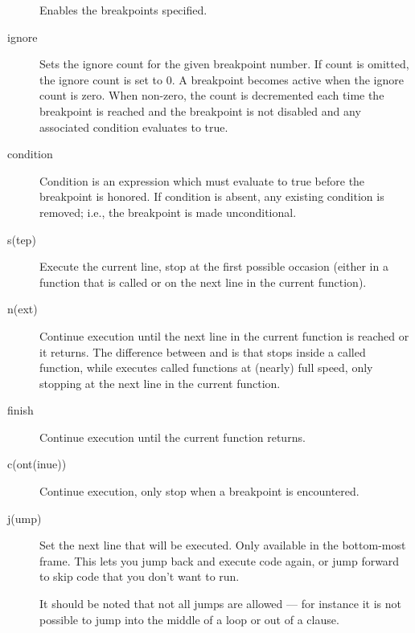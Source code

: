 \begin{description}
Enables the breakpoints specified.

\item[ignore \var{bpnumber} \optional{\var{count}}]

Sets the ignore count for the given breakpoint number.  If
count is omitted, the ignore count is set to 0.  A breakpoint
becomes active when the ignore count is zero.  When non-zero,
the count is decremented each time the breakpoint is reached
and the breakpoint is not disabled and any associated condition
evaluates to true.

\item[condition \var{bpnumber} \optional{\var{condition}}]

Condition is an expression which must evaluate to true before
the breakpoint is honored.  If condition is absent, any existing
condition is removed; i.e., the breakpoint is made unconditional.

\item[s(tep) \optional{\var{count}}]

Execute the current line, stop at the first possible occasion
(either in a function that is called or on the next line in the
current function).

\item[n(ext) \optional{\var{count}}]

Continue execution until the next line in the current function
is reached or it returns.  The difference between  and
 is that  stops inside a called function, while
 executes called functions at (nearly) full speed, only
stopping at the next line in the current function.

\item[finish]

Continue execution until the current function returns.

\item[c(ont(inue))]

Continue execution, only stop when a breakpoint is encountered.

\item[j(ump) \var{lineno}]

Set the next line that will be executed.  Only available in the
bottom-most frame.  This lets you jump back and execute code
again, or jump forward to skip code that you don't want to run.

It should be noted that not all jumps are allowed --- for instance it
is not possible to jump into the middle of a  loop or out
of a  clause.
\end{description}

